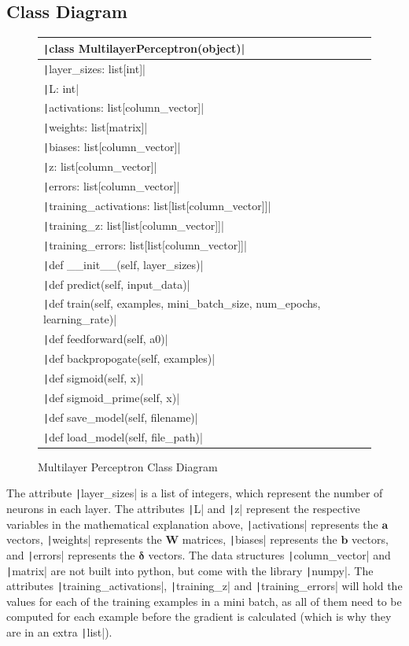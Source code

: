 \documentclass[12pt]{report}
\newcommand{\pil}[1]{\texttt|#1|}
\begin{document}
\subsection{Class Diagram}
\begin{figure}[H]
\centering
\begin{tabular}{| m{15cm} |} 
    \hline
    \pil{class MultilayerPerceptron(object)} \\
    \hline
    \pil{layer_sizes: list[int]} \\
    \pil{L: int} \\
    \pil{activations: list[column_vector]} \\
    \pil{weights: list[matrix]} \\
    \pil{biases: list[column_vector]} \\
    \pil{z: list[column_vector]} \\
    \pil{errors: list[column_vector]} \\
    \pil{training_activations: list[list[column_vector]]} \\
    \pil{training_z: list[list[column_vector]]} \\
    \pil{training_errors: list[list[column_vector]]} \\
    \hline
    \pil{def __init__(self, layer_sizes)} \\
    \pil{def predict(self, input_data)} \\
    \pil{def train(self, examples, mini_batch_size, num_epochs, learning_rate)} \\
    \pil{def feedforward(self, a0)} \\
    \pil{def backpropogate(self, examples)} \\
    \pil{def sigmoid(self, x)} \\
    \pil{def sigmoid_prime(self, x)} \\
    \pil{def save_model(self, filename)} \\
    \pil{def load_model(self, file_path)} \\
    \hline
\end{tabular}
\caption{Multilayer Perceptron Class Diagram}
\end{figure}

The attribute \pil{layer_sizes} is a list of integers, which represent the number of neurons in each layer. The attributes \pil{L} and \pil{z} represent the respective variables in the mathematical explanation above, \pil{activations} represents the $\mathbf{a}$ vectors, \pil{weights} represents the $\mathbf{W}$ matrices, \pil{biases} represents the $\mathbf{b}$ vectors, and \pil{errors} represents the $\bm{\delta}$ vectors. The data structures \pil{column_vector} and \pil{matrix} are not built into python, but come with the library \pil{numpy}. The attributes \pil{training_activations}, \pil{training_z} and \pil{training_errors} will hold the values for each of the training examples in a mini batch, as all of them need to be computed for each example before the gradient is calculated (which is why they are in an extra \pil{list}).
\end{document}
